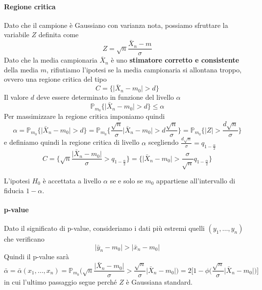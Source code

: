 \paragraph{Regione critica}
Dato che il campione è Gaussiano con varianza nota, possiamo sfruttare la variabile $Z$ definita come
\begin{equation*}
	Z = \sqrt{n}\frac{\bar{X}_n - m}{\sigma}
\end{equation*}
Dato che la media campionaria $\bar{X}_n$ è uno \textbf{stimatore corretto e consistente} della media $m$, rifiutiamo l'ipotesi se la media campionaria si allontana troppo, ovvero una regione critica del tipo
\begin{equation*}
	C = \{\lvert \bar{X}_n - m_0 \rvert > d\}
\end{equation*}
Il valore $d$ deve essere determinato in funzione del livello $\alpha$
\begin{equation*}
	\mathbb{P}_{m_0}\{\lvert \bar{X}_n - m_0 \rvert > d\} \leq \alpha
\end{equation*}
Per massimizzare la regione critica imponiamo quindi
\begin{equation*}
	\alpha = \mathbb{P}_{m_0}\{\lvert \bar{X}_n - m_0 \rvert > d\} = \mathbb{P}_{m_0}\{\frac{\sqrt{n}}{\sigma}\lvert \bar{X}_n - m_0 \rvert > d\frac{\sqrt{n}}{\sigma}\} = \mathbb{P}_{m_0}\{\lvert Z \rvert > \frac{d \sqrt{n}}{\sigma}\}
\end{equation*}
e definiamo quindi la regione critica di livello $\alpha$ scegliendo $\frac{d \sqrt{n}}{\sigma} = q_{1-\frac{\alpha}{2}}$
\begin{equation}
	C = \bigg\{\sqrt{n} \frac{\lvert \bar{X}_n - m_0 \rvert}{\sigma} > q_{1-\frac{\alpha}{2}}\bigg\} = \bigg\{ \lvert \bar{X}_n - m_0 \rvert > \frac{\sigma}{\sqrt{n}} q_{1-\frac{\alpha}{2}}\bigg\} 
\end{equation}

\begin{observation}
	L'ipotesi $H_0$ è accettata a livello $\alpha$ se e solo se $m_0$ appartiene all'intervallo di fiducia $1-\alpha$.
\end{observation}

\paragraph{p-value}
Dato il significato di p-value, consideriamo i dati più estremi quelli $(y_1, \ldots, y_n)$ che verificano
\begin{equation*}
	\lvert \bar{y}_n - m_0 \rvert > \lvert \bar{x}_n - m_0 \rvert
\end{equation*}
Quindi il p-value sarà
\begin{equation}
	\bar{\alpha} = \bar{\alpha}(x_1, \ldots, x_n) = \mathbb{P}_{m_0}\bigg(\sqrt{n}\frac{\lvert \bar{X}_n - m_0 \rvert}{\sigma} > \frac{\sqrt{n}}{\sigma} \lvert \bar{X}_n - m_0 \rvert\bigg) = 2 \bigg[1-\phi\bigg(\frac{\sqrt{n}}{\sigma} \lvert \bar{X}_n - m_0 \rvert\bigg)\bigg]
\end{equation}
in cui l'ultimo passaggio segue perché $Z$ è Gaussiana standard.